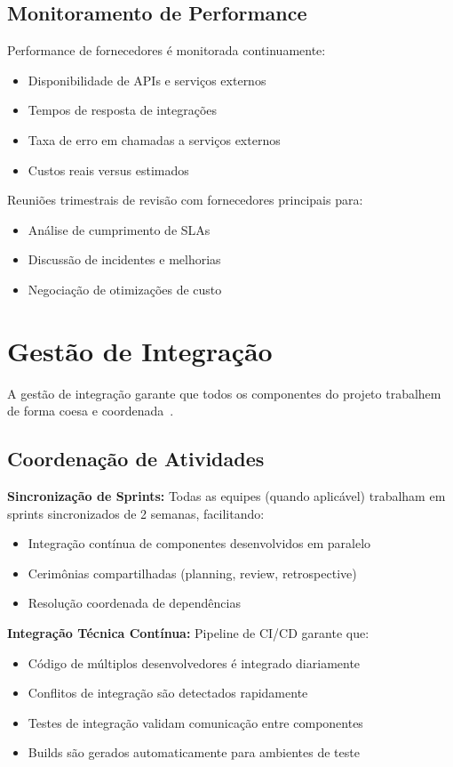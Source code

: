 \subsection{Monitoramento de Performance}

Performance de fornecedores é monitorada continuamente:
\begin{itemize}
    \item Disponibilidade de APIs e serviços externos
    \item Tempos de resposta de integrações
    \item Taxa de erro em chamadas a serviços externos
    \item Custos reais versus estimados
\end{itemize}

Reuniões trimestrais de revisão com fornecedores principais para:
\begin{itemize}
    \item Análise de cumprimento de SLAs
    \item Discussão de incidentes e melhorias
    \item Negociação de otimizações de custo
\end{itemize}

\section{Gestão de Integração}

A gestão de integração garante que todos os componentes do projeto trabalhem de forma coesa e coordenada~\cite{PMI:2021}.

\subsection{Coordenação de Atividades}

\textbf{Sincronização de Sprints:} Todas as equipes (quando aplicável) trabalham em sprints sincronizados de 2 semanas, facilitando:
\begin{itemize}
    \item Integração contínua de componentes desenvolvidos em paralelo
    \item Cerimônias compartilhadas (planning, review, retrospective)
    \item Resolução coordenada de dependências
\end{itemize}

\textbf{Integração Técnica Contínua:} Pipeline de CI/CD garante que:
\begin{itemize}
    \item Código de múltiplos desenvolvedores é integrado diariamente
    \item Conflitos de integração são detectados rapidamente
    \item Testes de integração validam comunicação entre componentes
    \item Builds são gerados automaticamente para ambientes de teste
\end{itemize}

